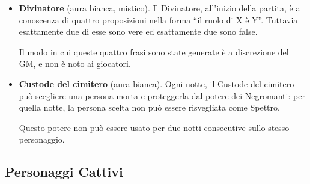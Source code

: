 \documentclass[a4paper,10pt]{article}
\begin{document}
\begin{itemize}
 \item {\bf Divinatore} (aura bianca, mistico). Il Divinatore, all'inizio della partita, è a conoscenza di quattro proposizioni nella forma ``il ruolo di X è Y''. Tuttavia esattamente due di esse sono vere ed esattamente due sono false.
 
 Il modo in cui queste quattro frasi sono state generate è a discrezione del GM, e non è noto ai giocatori.
 
 \item {\bf Custode del cimitero} (aura bianca). Ogni notte, il Custode del cimitero può scegliere una persona morta e proteggerla dal potere dei Negromanti: per quella notte, la persona scelta non può essere risvegliata come Spettro.
 
 Questo potere non può essere usato per due notti consecutive sullo stesso personaggio.

 
\end{itemize}


\subsection*{Personaggi Cattivi}
\end{document}

